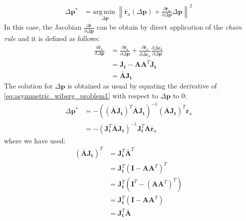 \begin{equation}
    \begin{aligned}
        \Delta\mathbf{p}^* & = \underset{\Delta\mathbf{p}}{\mathrm{arg\,min\;}}  \left\| \bar{\mathbf{r}}_a(\Delta\mathbf{p}) + \frac{\partial \bar{\mathbf{r}}_a}{\partial\Delta\mathbf{p}} \Delta\mathbf{p} \right\|^2
    \label{eq:asymmetric_wiberg_problem2}
    \end{aligned}
\end{equation}
In this case, the Jacobian $\frac{\partial \bar{\mathbf{r}}}{\partial \Delta \mathbf{p}}$ can be obtain by direct application of the \emph{chain rule} and it is defined as follows:
\begin{equation}
    \begin{aligned}
        \frac{d \bar{\mathbf{r}}_a}{d \Delta \mathbf{p}} & = \frac{\partial \bar{\mathbf{r}}_a}{\partial \Delta \mathbf{p}} + \frac{\partial \bar{\mathbf{r}}_a}{\partial \bar{\Delta \mathbf{c}}_a} \frac{\partial \bar{\Delta \mathbf{c}}_a}{\partial \Delta \mathbf{p}}
        \\
        & = \mathbf{J}_{\mathbf{t}} - \mathbf{A}\mathbf{A}^T\mathbf{J}_{\mathbf{t}}
        \\
        & = \bar{\mathbf{A}}\mathbf{J}_{\mathbf{t}}
    \label{eq:asymmetric_wiberg_jacobian}
    \end{aligned}
\end{equation}
The solution for $\Delta\mathbf{p}$ is obtained as usual by equating the derivative of \ref{eq:asymmetric_wiberg_problem1} with respect to $\Delta\mathbf{p}$ to 0:
\begin{equation}
    \begin{aligned}
    	\Delta \mathbf{p}^* & = - \left( \left( \bar{\mathbf{A}}\mathbf{J}_{\mathbf{t}} \right)^T \bar{\mathbf{A}} \mathbf{J}_{\mathbf{t}} \right)^{-1} \left( \bar{\mathbf{A}}\mathbf{J}_{\mathbf{t}} \right)^T \bar{\mathbf{r}}_a
    	\\
    	& = - \left( \mathbf{J}_{\mathbf{t}}^T \bar{\mathbf{A}} \mathbf{J}_{\mathbf{t}} \right)^{-1} \mathbf{J}_{\mathbf{t}}^T \bar{\mathbf{A}} \bar{\mathbf{r}}_a
    \label{eq:asymmetric_wiberg_solution}
    \end{aligned}
\end{equation}
where we have used:
\begin{equation}
	\begin{aligned}
		\left( \bar{\mathbf{A}}\mathbf{J}_{\mathbf{t}} \right)^T & = \mathbf{J}_{\mathbf{t}}^T \bar{\mathbf{A}}^T
		\\
		& = \mathbf{J}_{\mathbf{t}}^T \left( \mathbf{I} - \mathbf{A}\mathbf{A}^T \right)^T
		\\
		& = \mathbf{J}_{\mathbf{t}}^T \left( \mathbf{I}^T - \left( \mathbf{A}\mathbf{A}^T \right)^T \right)
		\\
		& = \mathbf{J}_{\mathbf{t}}^T \left( \mathbf{I} - \mathbf{A}\mathbf{A}^T \right)
		\\
		& = \mathbf{J}_{\mathbf{t}}^T \bar{\mathbf{A}}
	\label{eq:transposed_jacobian}
    \end{aligned}
\end{equation}
